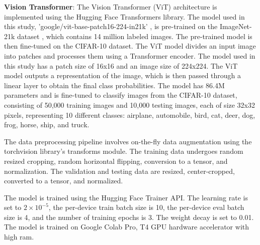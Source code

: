 \textbf{Vision Transformer}: The Vision Transformer (ViT) architecture \cite{dosovitskiy2020image} is implemented using the Hugging Face Transformers \cite{wolf2020huggingfaces}
library. The model used in this study, 'google/vit-base-patch16-224-in21k' \cite{wu2020visual}, is pre-trained on the ImageNet-21k dataset \cite{deng2009imagenet}, which contains 14 million labeled images. The pre-trained model is then fine-tuned on the CIFAR-10 dataset.
The ViT model divides an input image into patches and processes them using a Transformer encoder. The model used in this study has a patch size of 16x16 and an image size of 224x224. The ViT model outputs a representation of the image, which is then passed through a linear layer to obtain the final class probabilities.
The model has 86.4M parameters and is fine-tuned to classify images from the CIFAR-10 dataset, consisting of 50,000 training images and 10,000 testing images, each of size 32x32 pixels, representing 10 different classes: airplane, automobile, bird, cat, deer, dog, frog, horse, ship, and truck.

The data preprocessing pipeline involves on-the-fly data augmentation using the torchvision library's transforms module. The training data undergoes random resized cropping, random horizontal flipping, conversion to a tensor, and normalization. The validation and testing data are resized, center-cropped, converted to a tensor, and normalized.

The model is trained using the Hugging Face Trainer API. The learning rate is set to $2 \times 10^{-5}$, the per-device train batch size is 10, the per-device eval batch size is 4, and the number of training epochs is 3. The weight decay is set to 0.01. The model is trained on Google Colab Pro, T4 GPU hardware accelerator with high ram.

